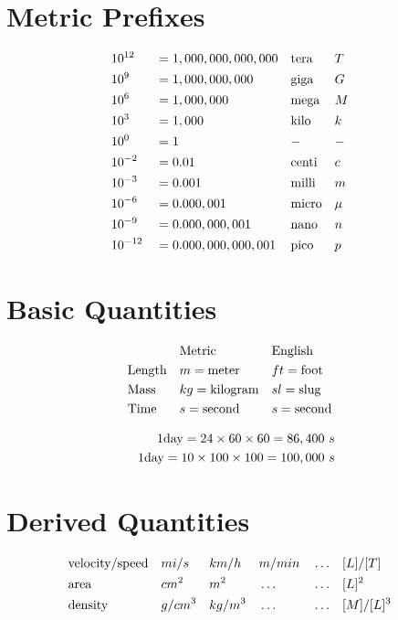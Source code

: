 \section{Metric Prefixes}
	\begin{align}
		&10^{12}& &= 1,000,000,000,000& &\text{tera}& &T& \notag \\
		&10^{9}& &= 1,000,000,000& &\text{giga}& &G& \notag \\
		&10^{6}& &= 1,000,000& &\text{mega}& &M& \notag \\
		&10^{3}& &= 1,000& &\text{kilo}& &k& \notag \\
		&10^{0}& &= 1& &-& &-& \notag \\
		&10^{-2}& &= 0.01& &\text{centi}& &c& \notag \\
		&10^{-3}& &= 0.001& &\text{milli}& &m& \notag \\
		&10^{-6}& &= 0.000,001& &\text{micro}& &\mu& \notag \\
		&10^{-9}& &= 0.000,000,001& &\text{nano}& &n& \notag \\
		&10^{-12}& &= 0.000,000,000,001& &\text{pico}& &p& \notag
	\end{align}

\section{Basic Quantities}
	\begin{align}
		&& &\text{Metric}& &\text{English}& \notag \\
		&\text{Length}& &m = \text{meter}& &ft = \text{foot}& \notag \\
		&\text{Mass}& &kg = \text{kilogram}& &sl = \text{slug}& \notag \\
		&\text{Time}& &s = \text{second}& &s = \text{second}& \notag
	\end{align}

	\begin{align}
		1 \text{day} = 24 \times 60 \times 60 = 86,400 \ s \notag \\
		1 \text{day} = 10 \times 100 \times 100 = 100,000 \ s \notag
	\end{align}

\section{Derived Quantities}
	\begin{align}
		&\text{velocity/speed}& &mi/s& &km/h& &m/min& &\dots& &[L]/[T]& \notag \\
		&\text{area}& &cm^{2}& &m^{2}& &\dots& &\dots& &[L]^{2}& \notag \\
		&\text{density}& &g/cm^{3}& &kg/m^{3}& &\dots& &\dots& &[M]/[L]^{3}& \notag
	\end{align}

